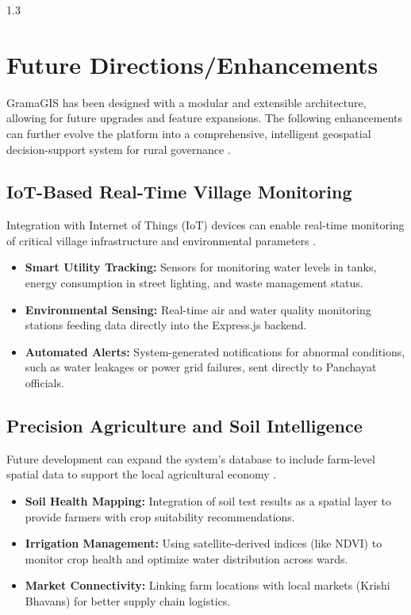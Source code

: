 \newpage
{}
\thispagestyle{empty}
%
\begin{spacing}{1.3}
%
\chapter{Future Directions/Enhancements}

GramaGIS has been designed with a modular and extensible architecture, allowing for future upgrades and feature expansions. The following enhancements can further evolve the platform into a comprehensive, intelligent geospatial decision-support system for rural governance \cite{fu2020webgis}.

\section{IoT-Based Real-Time Village Monitoring}

Integration with Internet of Things (IoT) devices can enable real-time monitoring of critical village infrastructure and environmental parameters \cite{smart_panchayat2023}.

\begin{itemize}
    \item \textbf{Smart Utility Tracking:} Sensors for monitoring water levels in tanks, energy consumption in street lighting, and waste management status.
    \item \textbf{Environmental Sensing:} Real-time air and water quality monitoring stations feeding data directly into the Express.js backend.
    \item \textbf{Automated Alerts:} System-generated notifications for abnormal conditions, such as water leakages or power grid failures, sent directly to Panchayat officials.
\end{itemize}



\section{Precision Agriculture and Soil Intelligence}

Future development can expand the system's database to include farm-level spatial data to support the local agricultural economy \cite{postgis_in_action}.

\begin{itemize}
    \item \textbf{Soil Health Mapping:} Integration of soil test results as a spatial layer to provide farmers with crop suitability recommendations.
    \item \textbf{Irrigation Management:} Using satellite-derived indices (like NDVI) to monitor crop health and optimize water distribution across wards.
    \item \textbf{Market Connectivity:} Linking farm locations with local markets (Krishi Bhavans) for better supply chain logistics.
\end{itemize}


\end{spacing}
